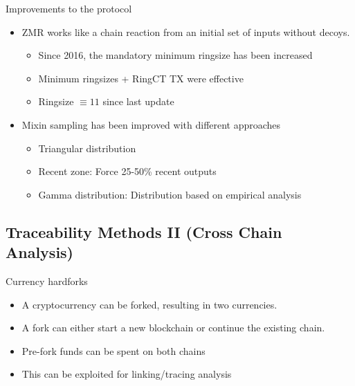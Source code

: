 \begin{frame}{Improvements to the protocol}
	\begin{itemize}
		\item ZMR works like a chain reaction from an initial set of inputs without decoys.
		\begin{itemize}
			\item Since 2016, the mandatory minimum ringsize has been increased
			\item Minimum ringsizes + RingCT TX were effective
			\item Ringsize $\equiv 11$ since last update
		\end{itemize}
		\item Mixin sampling has been improved with different approaches
		\begin{itemize}
			\item Triangular distribution
			\item Recent zone: Force 25-50\% recent outputs
			\item Gamma distribution: Distribution based on empirical analysis
		\end{itemize}
	\end{itemize}
\end{frame}
\subsection{Traceability Methods II (Cross Chain Analysis)}
\begin{frame}{Currency hardforks}
	\begin{itemize}
		\item A cryptocurrency can be forked, resulting in two currencies.
		\item A fork can either start a new blockchain or continue the existing chain.
		\begin{center}
			
		\end{center}
		\item Pre-fork funds can be spent on both chains
		\item This can be exploited for linking/tracing analysis
	\end{itemize}
\end{frame}

